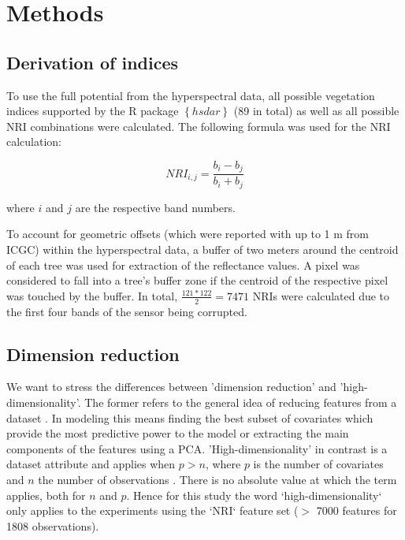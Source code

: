 \documentclass[letterpaper, peerreview]{IEEEtran}
\begin{document}
\section{Methods}

\subsection{Derivation of indices}
\noindent To use the full potential from the hyperspectral data, all possible vegetation indices supported by the R package $\left\{hsdar\right\}$ (89 in total) as well as all possible \ac{NRI} combinations were calculated.
The following formula was used for the NRI calculation:

\begin{equation}
	NRI_{i,j} = \frac{b_{i} - b_{j}}{b_{i} + b_{j}}
\end{equation}

\noindent
where \(i\) and \(j\) are the respective band numbers.

\bigbreak{}

\noindent To account for geometric offsets (which were reported with up to 1 m from \ac{ICGC}) within the hyperspectral data, a buffer of two meters around the centroid of each tree was used for extraction of the reflectance values.
A pixel was considered to fall into a tree's buffer zone if the centroid of the respective pixel was touched by the buffer.
In total, \(\frac{121*122}{2} = 7471\) NRIs were calculated due to the first four bands of the sensor being corrupted.

\subsection{Dimension reduction}

\noindent We want to stress the differences between 'dimension reduction' and 'high-dimensionality'.
The former refers to the general idea of reducing features from a dataset \cite{vandermaaten2007}.
In modeling this means finding the best subset of covariates which provide the most predictive power to the model or extracting the main components of the features using a \ac{PCA}.
'High-dimensionality' in contrast is a dataset attribute and applies when \(p > n\), where \(p\) is the number of covariates and \(n\) the number of observations \cite{hastie2001}.
There is no absolute value at which the term applies, both for \(n\) and \(p\).
Hence for this study the word ‘high-dimensionality‘ only applies to the experiments using the ‘NRI‘ feature set ($>$ 7000 features for 1808 observations).
\end{document}
